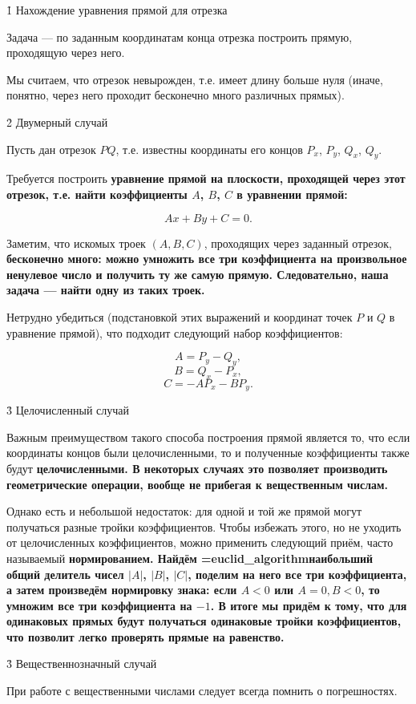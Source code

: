 \h1{ Нахождение уравнения прямой для отрезка }

Задача --- по заданным координатам конца отрезка построить прямую, проходящую через него.

Мы считаем, что отрезок невырожден, т.е. имеет длину больше нуля (иначе, понятно, через него проходит бесконечно много различных прямых).


\h2{ Двумерный случай }

Пусть дан отрезок $PQ$, т.е. известны координаты его концов $P_x$, $P_y$, $Q_x$, $Q_y$.

Требуется построить \bf{уравнение прямой на плоскости}, проходящей через этот отрезок, т.е. найти коэффициенты $A$, $B$, $C$ в уравнении прямой:

$$ A x + B y + C = 0. $$

Заметим, что искомых троек $(A,B,C)$, проходящих через заданный отрезок, \bf{бесконечно много}: можно умножить все три коэффициента на произвольное ненулевое число и получить ту же самую прямую. Следовательно, наша задача --- найти одну из таких троек.

Нетрудно убедиться (подстановкой этих выражений и координат точек $P$ и $Q$ в уравнение прямой), что подходит следующий набор коэффициентов:

$$ A = P_y - Q_y, $$
$$ B = Q_x - P_x, $$
$$ C = - A P_x - B P_y. $$


\h3{ Целочисленный случай }

Важным преимуществом такого способа построения прямой является то, что если координаты концов были целочисленными, то и полученные коэффициенты также будут \bf{целочисленными}. В некоторых случаях это позволяет производить геометрические операции, вообще не прибегая к вещественным числам.

Однако есть и небольшой недостаток: для одной и той же прямой могут получаться разные тройки коэффициентов. Чтобы избежать этого, но не уходить от целочисленных коэффициентов, можно применить следующий приём, часто называемый \bf{нормированием}. Найдём \algohref=euclid_algorithm{наибольший общий делитель} чисел $|A|$, $|B|$, $|C|$, поделим на него все три коэффициента, а затем произведём нормировку знака: если $A<0$ или $A=0, B<0$, то умножим все три коэффициента на $-1$. В итоге мы придём к тому, что для одинаковых прямых будут получаться одинаковые тройки коэффициентов, что позволит легко проверять прямые на равенство.


\h3{ Вещественнозначный случай }

При работе с вещественными числами следует всегда помнить о погрешностях.

